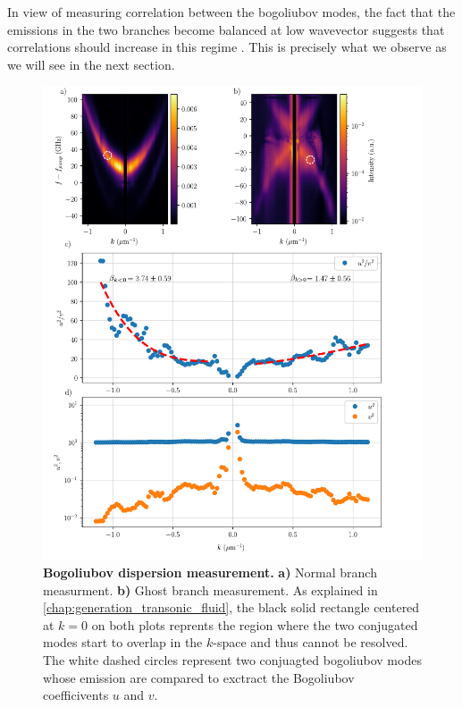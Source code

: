 In view of measuring correlation between the bogoliubov modes, the fact that the emissions in the two branches become balanced at low wavevector suggests that correlations should increase in this regime \cite{treps_fabre_criteria_2004}. This is precisely what we observe as we will see in the next section.


\begin{figure}
    \centering
    \includegraphics[width=1\textwidth]{chap_correlation/fig/uv_analysis.pdf}
    \caption{\textbf{Bogoliubov dispersion measurement.} \textbf{a)} Normal branch measurment. \textbf{b)} Ghost branch measurement. As explained in \autoref{chap:generation_transonic_fluid}, the black solid rectangle
    centered at $k=0$ on both plots reprents the region where the two conjugated modes start to overlap in the $k$-space and thus cannot be resolved. The white dashed circles represent two conjuagted bogoliubov modes whose emission are compared to exctract the Bogoliubov coefficivents $u$ and $v$.}
    \label{fig:uv_analysis}
\end{figure} 

